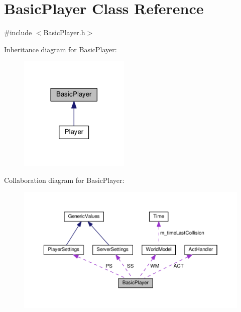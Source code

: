 \hypertarget{classBasicPlayer}{}\section{Basic\+Player Class Reference}
\label{classBasicPlayer}


{\ttfamily \#include $<$Basic\+Player.\+h$>$}



Inheritance diagram for Basic\+Player\+:
\nopagebreak
\begin{figure}[H]
\begin{center}
\leavevmode
\includegraphics[width=149pt]{classBasicPlayer__inherit__graph}
\end{center}
\end{figure}


Collaboration diagram for Basic\+Player\+:
\nopagebreak
\begin{figure}[H]
\begin{center}
\leavevmode
\includegraphics[width=350pt]{classBasicPlayer__coll__graph}
\end{center}
\end{figure}
